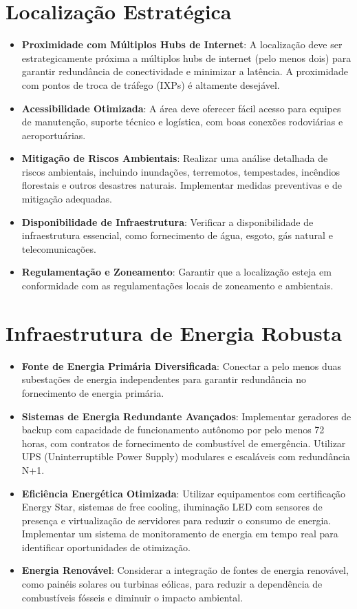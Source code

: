 \documentclass[
	12pt,				%
	oneside,			%
	a4paper,			%
	english,			%
	brazil				%
	]{abntex2unama}
\begin{document}
\section{Localização Estratégica}

\begin{itemize}
	\item \textbf{Proximidade com Múltiplos Hubs de Internet}: A localização deve ser estrategicamente próxima a múltiplos hubs de internet (pelo menos dois) para garantir redundância de conectividade e minimizar a latência. A proximidade com pontos de troca de tráfego (IXPs) é altamente desejável.
	\item \textbf{Acessibilidade Otimizada}: A área deve oferecer fácil acesso para equipes de manutenção, suporte técnico e logística, com boas conexões rodoviárias e aeroportuárias.
	\item \textbf{Mitigação de Riscos Ambientais}: Realizar uma análise detalhada de riscos ambientais, incluindo inundações, terremotos, tempestades, incêndios florestais e outros desastres naturais. Implementar medidas preventivas e de mitigação adequadas.
	\item \textbf{Disponibilidade de Infraestrutura}: Verificar a disponibilidade de infraestrutura essencial, como fornecimento de água, esgoto, gás natural e telecomunicações.
	\item \textbf{Regulamentação e Zoneamento}: Garantir que a localização esteja em conformidade com as regulamentações locais de zoneamento e ambientais.
\end{itemize}

\section{Infraestrutura de Energia Robusta}

\begin{itemize}
	\item \textbf{Fonte de Energia Primária Diversificada}: Conectar a pelo menos duas subestações de energia independentes para garantir redundância no fornecimento de energia primária.
	\item \textbf{Sistemas de Energia Redundante Avançados}: Implementar geradores de backup com capacidade de funcionamento autônomo por pelo menos 72 horas, com contratos de fornecimento de combustível de emergência. Utilizar UPS (Uninterruptible Power Supply) modulares e escaláveis com redundância N+1.
	\item \textbf{Eficiência Energética Otimizada}: Utilizar equipamentos com certificação Energy Star, sistemas de free cooling, iluminação LED com sensores de presença e virtualização de servidores para reduzir o consumo de energia. Implementar um sistema de monitoramento de energia em tempo real para identificar oportunidades de otimização.
	\item \textbf{Energia Renovável}: Considerar a integração de fontes de energia renovável, como painéis solares ou turbinas eólicas, para reduzir a dependência de combustíveis fósseis e diminuir o impacto ambiental.
\end{itemize}
\end{document}
